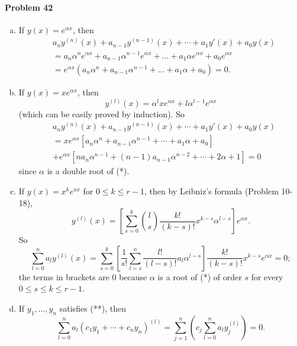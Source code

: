 \documentclass{article}
\begin{document}
\paragraph{Problem 42}
\begin{enumerate}[(a)]
  \item If $y(x) = e^{\alpha x}$, then
    \begin{align*}
      &a_ny^{(n)}(x) + a_{n-1}y^{(n-1)}(x) + \cdots + a_1y'(x) + a_0y(x) \\
      &= a_n\alpha^ne^{\alpha x} + a_{n-1}\alpha^{n-1}e^{\alpha x} + \ldots +
      a_1\alpha e^{\alpha x} + a_0e^{\alpha x} \\
      &= e^{\alpha x}(a_n\alpha^n + a_{n-1}\alpha^{n-1} + \ldots + a_1\alpha +
      a_0) = 0.
    \end{align*}
  \item If $y(x) = xe^{\alpha x}$, then \[
      y^{(l)}(x) = \alpha^lxe^{\alpha x} + l\alpha^{l-1}e^{\alpha x}
    \] (which can be easily proved by induction). So
    \begin{align*}
      &a_ny^{(n)}(x) + a_{n-1}y^{(n-1)}(x) + \cdots + a_1y'(x) + a_0y(x) \\
      &= xe^{\alpha x}[a_n\alpha^n + a_{n-1}\alpha^{n-1} + \cdots + a_1\alpha +
      a_0] \\
      &+ e^{\alpha x}[na_n\alpha^{n-1} + (n-1)a_{n-1}\alpha^{n-2} + \cdots +
      2\alpha + 1] = 0
    \end{align*}
    since $\alpha$ is a double root of (*).
  \item If $y(x) = x^ke^{ax}$ for $0 \leq k \leq r - 1$, then by Leibniz's
    formula (Problem 10-18), \[
      y^{(l)}(x) = \left[
        \sum_{s=0}^k \binom{l}{s}\frac{k!}{(k-s)!}x^{k-s}\alpha^{l-s}
      \right]e^{\alpha x}.
    \] So \[
      \sum_{l=0}^n a_ly^{(l)}(x) = \sum_{s=0}^k\left[
        \frac{1}{s!}\sum_{l=s}^n\frac{l!}{(l-s)!}a_l\alpha^{l-s}
      \right]\frac{k!}{(k-s)!}x^{k-s}e^{\alpha x} = 0;
    \] the terms in brackets are 0 because $\alpha$ is a root of (*) of order
    $s$ for every $0 \leq s \leq k \leq r - 1$.
  \item If $y_1, \ldots, y_n$ satisfies (**), then \[
      \sum_{l=0}^na_l(c_1y_1 + \cdots + c_ny_n)^{(l)}
      = \sum_{j=1}^n\left(c_j\sum_{l=0}^na_ly_j^{(l)}\right)
      = 0.
    \]
\end{enumerate}
\end{document}
